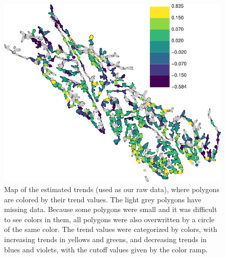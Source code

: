 \documentclass[11pt, titlepage]{article}\usepackage[]{graphicx}\usepackage[]{color}
\begin{document}
\begin{spacing}{1.9}
\begin{flushleft}



\begin{figure}[H]
  \begin{center}
  \includegraphics[width=\linewidth]{figure/Fig-MapRaw.png}
  \end{center}
  \caption{Map of the estimated trends (used as our raw data), where polygons are colored by their trend values.  The light grey polygons have missing data.  Because some polygons were small and it was difficult to see colors in them, all polygons were also overwritten by a circle of the same color. The trend values were categorized by colors, with increasing trends in yellows and greens, and decreasing trends in blues and violets, with the cutoff values given by the color ramp. \label{Fig-MapRaw}}     
\end{figure}





\end{flushleft}
\end{spacing}
\end{document}
